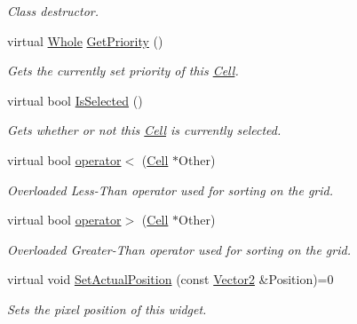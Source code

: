 \begin{DoxyCompactItemize}
\begin{DoxyCompactList}\small\item\em Class destructor. \item\end{DoxyCompactList}\item 
virtual \hyperlink{namespaceMezzanine_adcbb6ce6d1eb4379d109e51171e2e493}{Whole} \hyperlink{classMezzanine_1_1UI_1_1Cell_a6e45a4910d845723cd7ce136efc69fdf}{GetPriority} ()
\begin{DoxyCompactList}\small\item\em Gets the currently set priority of this \hyperlink{classMezzanine_1_1UI_1_1Cell}{Cell}. \item\end{DoxyCompactList}\item 
virtual bool \hyperlink{classMezzanine_1_1UI_1_1Cell_abc3d1123a50e1331974ef857876a0572}{IsSelected} ()
\begin{DoxyCompactList}\small\item\em Gets whether or not this \hyperlink{classMezzanine_1_1UI_1_1Cell}{Cell} is currently selected. \item\end{DoxyCompactList}\item 
virtual bool \hyperlink{classMezzanine_1_1UI_1_1Cell_a178dda3621c1489b7b958c35a4dedf15}{operator$<$} (\hyperlink{classMezzanine_1_1UI_1_1Cell}{Cell} $\ast$Other)
\begin{DoxyCompactList}\small\item\em Overloaded Less-\/Than operator used for sorting on the grid. \item\end{DoxyCompactList}\item 
virtual bool \hyperlink{classMezzanine_1_1UI_1_1Cell_aa3232348bada9f540df323c34f513784}{operator$>$} (\hyperlink{classMezzanine_1_1UI_1_1Cell}{Cell} $\ast$Other)
\begin{DoxyCompactList}\small\item\em Overloaded Greater-\/Than operator used for sorting on the grid. \item\end{DoxyCompactList}\item 
virtual void \hyperlink{classMezzanine_1_1UI_1_1Cell_ada818056ebb50413109b1c8d8a7fa3e0}{SetActualPosition} (const \hyperlink{classMezzanine_1_1Vector2}{Vector2} \&Position)=0
\begin{DoxyCompactList}\small\item\em Sets the pixel position of this widget. \item\end{DoxyCompactList}\item 

\end{DoxyCompactItemize}
